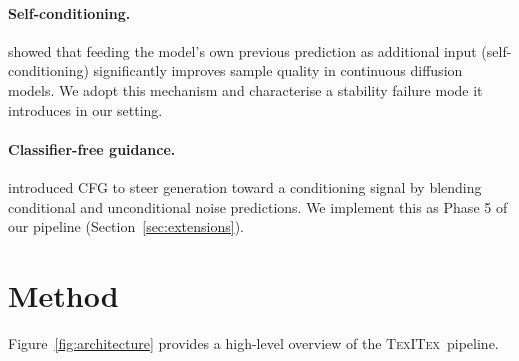 \documentclass[11pt,a4paper]{article}
\newcommand{\texitex}{\textsc{TexITex}}
\begin{document}
\paragraph{Self-conditioning.}
\citet{chen2022analog} showed that feeding the model's own previous prediction as
additional input (self-conditioning) significantly improves sample quality in continuous
diffusion models. We adopt this mechanism and characterise a stability failure mode it
introduces in our setting.

\paragraph{Classifier-free guidance.}
\citet{ho2022cfg} introduced CFG to steer generation toward a conditioning signal
by blending conditional and unconditional noise predictions. We implement this as
Phase 5 of our pipeline (Section~\ref{sec:extensions}).


\section{Method}
\label{sec:method}

Figure~\ref{fig:architecture} provides a high-level overview of the \texitex\ pipeline.
\end{document}
